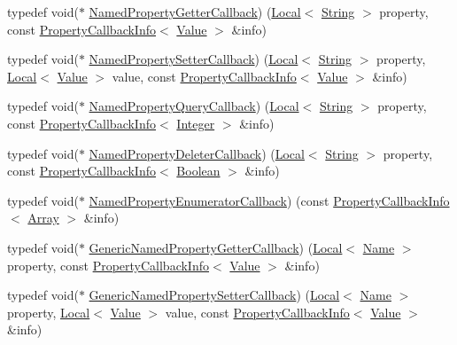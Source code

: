 \begin{DoxyCompactItemize}
\item 
typedef void($\ast$ \hyperlink{namespacev8_a50cae386a68bf9ff23d02aa1161face4}{Named\+Property\+Getter\+Callback}) (\hyperlink{classv8_1_1Local}{Local}$<$ \hyperlink{classv8_1_1String}{String} $>$ property, const \hyperlink{classv8_1_1PropertyCallbackInfo}{Property\+Callback\+Info}$<$ \hyperlink{classv8_1_1Value}{Value} $>$ \&info)
\item 
typedef void($\ast$ \hyperlink{namespacev8_a9587769513971dc7cb301b740d9e66b6}{Named\+Property\+Setter\+Callback}) (\hyperlink{classv8_1_1Local}{Local}$<$ \hyperlink{classv8_1_1String}{String} $>$ property, \hyperlink{classv8_1_1Local}{Local}$<$ \hyperlink{classv8_1_1Value}{Value} $>$ value, const \hyperlink{classv8_1_1PropertyCallbackInfo}{Property\+Callback\+Info}$<$ \hyperlink{classv8_1_1Value}{Value} $>$ \&info)
\item 
typedef void($\ast$ \hyperlink{namespacev8_ac135beae5f0c8b290255accb438f990e}{Named\+Property\+Query\+Callback}) (\hyperlink{classv8_1_1Local}{Local}$<$ \hyperlink{classv8_1_1String}{String} $>$ property, const \hyperlink{classv8_1_1PropertyCallbackInfo}{Property\+Callback\+Info}$<$ \hyperlink{classv8_1_1Integer}{Integer} $>$ \&info)
\item 
typedef void($\ast$ \hyperlink{namespacev8_aaba861076c5b111912cfa0791d348437}{Named\+Property\+Deleter\+Callback}) (\hyperlink{classv8_1_1Local}{Local}$<$ \hyperlink{classv8_1_1String}{String} $>$ property, const \hyperlink{classv8_1_1PropertyCallbackInfo}{Property\+Callback\+Info}$<$ \hyperlink{classv8_1_1Boolean}{Boolean} $>$ \&info)
\item 
typedef void($\ast$ \hyperlink{namespacev8_a5f6f16818a9cddacadbfe6d90ca3a6b1}{Named\+Property\+Enumerator\+Callback}) (const \hyperlink{classv8_1_1PropertyCallbackInfo}{Property\+Callback\+Info}$<$ \hyperlink{classv8_1_1Array}{Array} $>$ \&info)
\item 
typedef void($\ast$ \hyperlink{namespacev8_a24b1801fa53a7c5a71366d8044927563}{Generic\+Named\+Property\+Getter\+Callback}) (\hyperlink{classv8_1_1Local}{Local}$<$ \hyperlink{classv8_1_1Name}{Name} $>$ property, const \hyperlink{classv8_1_1PropertyCallbackInfo}{Property\+Callback\+Info}$<$ \hyperlink{classv8_1_1Value}{Value} $>$ \&info)
\item 
typedef void($\ast$ \hyperlink{namespacev8_af74716c6e95a269c6cd4314662fd0a7e}{Generic\+Named\+Property\+Setter\+Callback}) (\hyperlink{classv8_1_1Local}{Local}$<$ \hyperlink{classv8_1_1Name}{Name} $>$ property, \hyperlink{classv8_1_1Local}{Local}$<$ \hyperlink{classv8_1_1Value}{Value} $>$ value, const \hyperlink{classv8_1_1PropertyCallbackInfo}{Property\+Callback\+Info}$<$ \hyperlink{classv8_1_1Value}{Value} $>$ \&info)

\end{DoxyCompactItemize}
